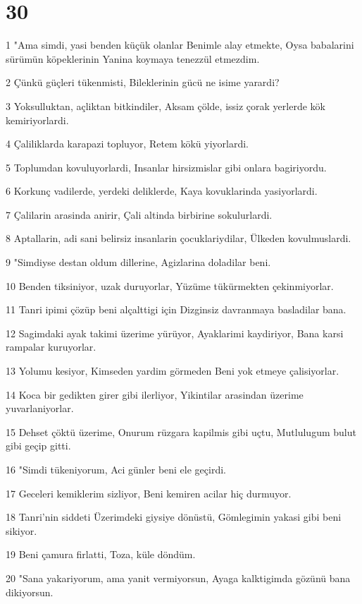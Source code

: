 \chapter{30}

\par 1 "Ama simdi, yasi benden küçük olanlar Benimle alay etmekte, Oysa babalarini sürümün köpeklerinin Yanina koymaya tenezzül etmezdim.
\par 2 Çünkü güçleri tükenmisti, Bileklerinin gücü ne isime yarardi?
\par 3 Yoksulluktan, açliktan bitkindiler, Aksam çölde, issiz çorak yerlerde kök kemiriyorlardi.
\par 4 Çaliliklarda karapazi topluyor, Retem kökü yiyorlardi.
\par 5 Toplumdan kovuluyorlardi, Insanlar hirsizmislar gibi onlara bagiriyordu.
\par 6 Korkunç vadilerde, yerdeki deliklerde, Kaya kovuklarinda yasiyorlardi.
\par 7 Çalilarin arasinda anirir, Çali altinda birbirine sokulurlardi.
\par 8 Aptallarin, adi sani belirsiz insanlarin çocuklariydilar, Ülkeden kovulmuslardi.
\par 9 "Simdiyse destan oldum dillerine, Agizlarina doladilar beni.
\par 10 Benden tiksiniyor, uzak duruyorlar, Yüzüme tükürmekten çekinmiyorlar.
\par 11 Tanri ipimi çözüp beni alçalttigi için Dizginsiz davranmaya basladilar bana.
\par 12 Sagimdaki ayak takimi üzerime yürüyor, Ayaklarimi kaydiriyor, Bana karsi rampalar kuruyorlar.
\par 13 Yolumu kesiyor, Kimseden yardim görmeden Beni yok etmeye çalisiyorlar.
\par 14 Koca bir gedikten girer gibi ilerliyor, Yikintilar arasindan üzerime yuvarlaniyorlar.
\par 15 Dehset çöktü üzerime, Onurum rüzgara kapilmis gibi uçtu, Mutlulugum bulut gibi geçip gitti.
\par 16 "Simdi tükeniyorum, Aci günler beni ele geçirdi.
\par 17 Geceleri kemiklerim sizliyor, Beni kemiren acilar hiç durmuyor.
\par 18 Tanri'nin siddeti Üzerimdeki giysiye dönüstü, Gömlegimin yakasi gibi beni sikiyor.
\par 19 Beni çamura firlatti, Toza, küle döndüm.
\par 20 "Sana yakariyorum, ama yanit vermiyorsun, Ayaga kalktigimda gözünü bana dikiyorsun.
